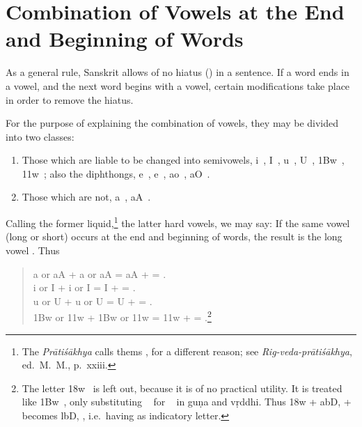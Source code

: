 \section{Combination of Vowels at the End and Beginning of Words}

\s As a general rule, Sanskrit allows of no hiatus () in a
sentence. If a word ends in a vowel, and the next word begins with a
vowel, certain modifications take place in order to remove the hiatus.

\s For the purpose of explaining the combination of vowels, they may be
divided into two classes:

\begin{enumerate}
\item Those which are liable to be changed into semivowels, {\dn i}~,
  {\dn I}~, {\dn u}~, {\dn U}~, {\dn \31Bw}~,
  {\dn \311w}~; also the diphthongs, {\dn e}~, {\dn e\?}~,
  {\dn ao}~, {\dn aO}~.

\item Those which are not, {\dn a}~, {\dn aA}~.
\end{enumerate}

Calling the former liquid,\footnote{The \emph{Prātiśākhya} calls thems
  , for a different reason; see \emph{Rig-veda-prātiśākhya},
  ed.\ M.\ M., p.\ xxiii.} the latter hard vowels, we may say: If the
same vowel (long or short) occurs at the end and beginning of words, the
result is the long vowel . Thus

\begin{quote}
  {\dn a} or {\dn aA} + {\dn a} or {\dn aA} = {\dn aA}  +  =
  .\\
  {\dn i} or {\dn I} + {\dn i} or {\dn I} = {\dn I}  +  =
  .\\
  {\dn u} or {\dn U} + {\dn u} or {\dn U} = {\dn U}  +  =
  .\\
  {\dn \31Bw} or {\dn \311w} + {\dn \31Bw} or {\dn \311w} = {\dn \311w}  +  =
  .\footnote{The letter {\dn \318w}~ is left out, because
    it is of no practical utility. It is treated like {\dn \31Bw}~, only
    substituting {\dn {}}~ for {\dn {}}~ in guṇa and vṛddhi. Thus
    {\dn \318w} + {\dn ab\2D,}  +  becomes
    {\dn lb\2D,} , i.e.\ having  as indicatory
    letter.}
\end{quote}

